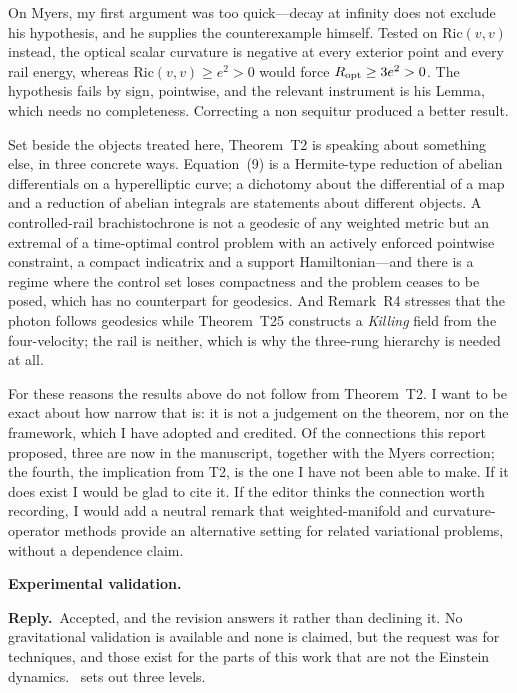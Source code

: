 \documentclass[11pt]{article}
\newcommand{\reply}{\par\noindent\textbf{Reply.}\ }
\newcommand{\R}[1]{\par\medskip\noindent\textbf{#1}\par\nopagebreak}
\begin{document}
On Myers, my first argument was too quick---decay at infinity does not exclude his
hypothesis, and he supplies the counterexample himself. Tested on
$\mathrm{Ric}(v,v)$ instead, the optical scalar curvature is negative at every
exterior point and every rail energy, whereas $\mathrm{Ric}(v,v)\ge e^2>0$ would
force $R_{\rm opt}\ge3e^2>0$. The hypothesis fails by sign, pointwise, and the
relevant instrument is his Lemma, which needs no completeness. Correcting a non
sequitur produced a better result.

Set beside the objects treated here, Theorem~T2 is speaking about something else, in
three concrete ways. Equation~(9) is a Hermite-type reduction of abelian differentials
on a hyperelliptic curve; a dichotomy about the differential of a map and a reduction
of abelian integrals are statements about different objects. A controlled-rail
brachistochrone is not a geodesic of any weighted metric but an extremal of a
time-optimal control problem with an actively enforced pointwise constraint, a compact
indicatrix and a support Hamiltonian---and there is a regime where the control set
loses compactness and the problem ceases to be posed, which has no counterpart for
geodesics. And Remark~R4 stresses that the photon follows geodesics while
Theorem~T25 constructs a \emph{Killing} field from the four-velocity; the rail is
neither, which is why the three-rung hierarchy is needed at all.

For these reasons the results above do not follow from Theorem~T2. I want to be exact
about how narrow that is: it is not a judgement on the theorem, nor on the framework,
which I have adopted and credited. Of the connections this report proposed, three are
now in the manuscript, together with the Myers correction; the fourth, the implication
from T2, is the one I have not been able to make. If it does exist I would be glad to
cite it. If the editor thinks the connection worth recording, I would add a neutral
remark that weighted-manifold and curvature-operator methods provide an alternative
setting for related variational problems, without a dependence claim.

\R{Experimental validation.}
\reply Accepted, and the revision answers it rather than declining it. No
gravitational validation is available and none is claimed, but the request was for
techniques, and those exist for the parts of this work that are not the Einstein
dynamics. \msAppValidation\ sets out three levels.
\end{document}
